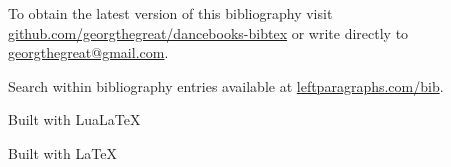 \documentclass[10pt,a4paper]{article}
\begin{document}
To obtain the latest version of this bibliography visit \href{http://github.com/georgthegreat/dancebooks-bibtex}{github.com/georgthegreat/dancebooks-bibtex} or write directly to \href{mailto://georgthegreat@gmail.com}{georgthegreat@gmail.com}.

Search within bibliography entries available at \href{http://leftparagraphs.com/bib/index.html}{leftparagraphs.com/bib}.

\ifluatex

Built with Lua\LaTeX

\else\ifpdf

Built with \LaTeX

\fi\fi

\nocite{*}
\printbibliography
\end{document}
